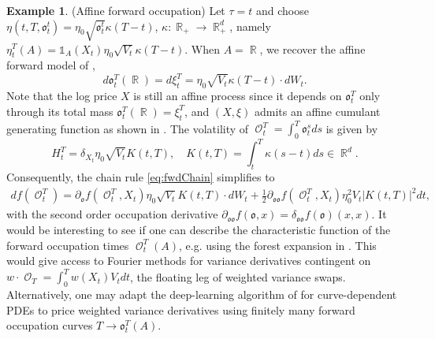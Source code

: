 \documentclass[11pt]{article}
\def\mo{\mathfrak{o}}
\theoremstyle{plain}
\theoremstyle{definition}
\newtheorem{example}{Example}
\DeclareMathOperator{\R}{\mathbb{R}}
\DeclareMathOperator{\calO}{\mathcal{O}}
\begin{document}
\begin{example}\label{ex:AffineFwdModels}  (Affine forward occupation)
  Let  $\tau = t$ and choose $\eta(t,T,\mo_t^{t}) = \eta_0\sqrt{\mo_t^t} \kappa(T-t)$, $\kappa:\R_+\to \R_+^d$, namely
  $\eta_t^T(A) = \mathds{1}_{A}(X_t)\eta_0\sqrt{V_t}\kappa(T-t).$ When $A = \R$, we recover the affine forward model of \citet{GatheralKeller}, 
  $$ d\mo_t^T(\R) = d\xi_t^T = \eta_0\sqrt{V_t}\kappa(T-t)\cdot dW_t.$$ 
  Note that the log price $X$ is still an affine process since it depends on $\mo_t^T$ only through its total mass $\mo_t^T(\R) = \xi_t^T$, and $(X,\xi)$ admits an affine cumulant generating function as shown in  \cite{GatheralKeller}. The volatility of $\calO_t^{T} = \int_0^T \mo_t^sds$ is given by 
  \begin{equation}
      H_t^T = \delta_{X_t}\eta_0\sqrt{V_t}K(t,T),\quad K(t,T) = \int_t^T\kappa(s-t)ds \in \R^d.
  \end{equation}
  Consequently, the chain rule \eqref{eq:fwdChain} simplifies to 
  \begin{align*}
   df(\calO^T_t) =   \partial_{\mo}f(\calO_t^T,X_t) \eta_0 \sqrt{V_t}K(t,T)\cdot dW_t +  \frac{1}{2} \partial_{\mo\mo}f(\calO_t^T,X_t) \eta_0^2 V_t |K(t,T)|^2dt ,
\end{align*}
with the second order occupation derivative $\partial_{\mo\mo}f(\mo,x) = \delta_{\mo\mo}f(\mo)(x,x)$. 
It would be interesting to see if one can describe the characteristic function of the forward occupation times $\calO_t^T(A)$, e.g. using the  forest expansion in \citet{Friz2023forest}. This would give access to Fourier methods for  variance  derivatives contingent on  $w\cdot \calO_T = \int_0^Tw(X_t)V_tdt$, the floating leg of weighted variance swaps. 
Alternatively, one may adapt  the deep-learning algorithm of \citet{JackCurve} for curve-dependent PDEs to price weighted variance derivatives using finitely many forward occupation  curves $T\to \mo_t^{T}(A)$.



\end{example}
\end{document}
